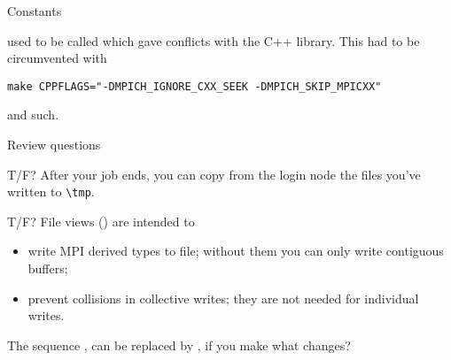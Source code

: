  {Constants}

 used to be called 
which gave conflicts with the C++ library. This had to be circumvented
with
\begin{verbatim}
make CPPFLAGS="-DMPICH_IGNORE_CXX_SEEK -DMPICH_SKIP_MPICXX"
\end{verbatim}
and such.


\newpage
{} {Review questions}

\begin{tacc}
  \begin{exercise}
    T/F?
    After your  job ends, you can copy
    from the login node
    the files you've written to \verb+\tmp+. 
\end{exercise}
\end{tacc}

\begin{exercise}
  T/F?
  File views () are intended to
  \begin{itemize}
  \item write MPI derived types to file; without them you can only write
    contiguous buffers;
  \item prevent collisions in collective writes; they are not needed for
    individual writes.
  \end{itemize}
\end{exercise}

\begin{exercise}
  The sequence , 
  can be replaced by , 
  if you make what changes?
\end{exercise}
